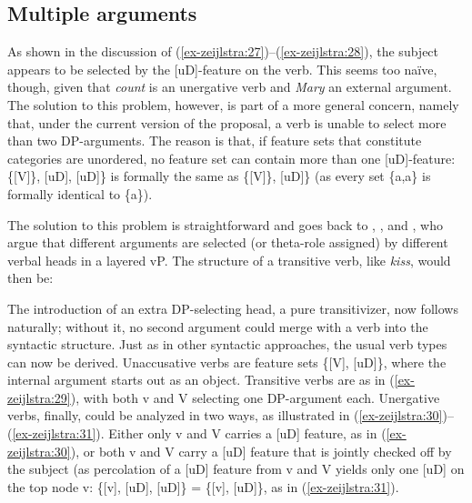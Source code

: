\documentclass[output=paper
,modfonts
,nonflat]{langsci/langscibook}
\begin{document}
\subsection{Multiple arguments} \label{sec-zeijlstra:3.5}
As shown in the discussion of (\ref{ex-zeijlstra:27})–(\ref{ex-zeijlstra:28}), the subject appears to be selected by the [uD]-feature on the verb. This seems too naïve, though, given that \textit{count} is an unergative verb and \textit{Mary} an external argument. The solution to this problem, however, is part of a more general concern, namely that, under the current version of the proposal, a verb is unable to select more than two DP-arguments. The reason is that, if feature sets that constitute categories are unordered, no feature set can contain more than one [uD]-feature: \{[V]\}, [uD], [uD]\} is formally the same as \{[V]\}, [uD]\} (as every set \{a,a\} is formally identical to \{a\}).

The solution to this problem is straightforward and goes back to \citet{Larson1988},  \citet{Hale_Keyser1993}, and \citet{Kratzer1996}, who argue that different arguments are selected (or theta-role assigned) by different verbal heads in a layered vP. The structure of a transitive verb, like \textit{kiss}, would then be: 

\begin{figure}[!h]
	\begin{exe}
	\end{exe} \vspace{-0.75cm}
\end{figure}
\noindent The introduction of an extra DP-selecting head, a pure transitivizer, now follows naturally; without it, no second argument could merge with a verb into the syntactic structure. Just as in other syntactic approaches, the usual verb types can now be derived. Unaccusative verbs are feature sets \{[V], [uD]\}, where the internal argument starts out as an object. Transitive verbs are as in (\ref{ex-zeijlstra:29}), with both v and V selecting one DP-argument each. Unergative verbs, finally, could be analyzed in two ways, as illustrated in (\ref{ex-zeijlstra:30})–(\ref{ex-zeijlstra:31}). Either only v and V carries a [uD] feature, as in (\ref{ex-zeijlstra:30}), or both v and V carry a [uD] feature that is jointly checked off by the subject (as percolation of a [uD] feature from v and V yields only one [uD] on the top node v: \{[v], [uD], [uD]\} = \{[v], [uD]\}, as in (\ref{ex-zeijlstra:31}).
\end{document}

